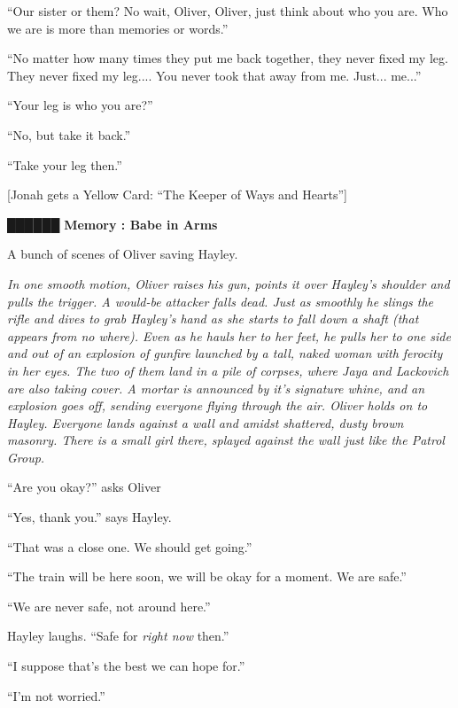 ``Our sister or them?  No wait, Oliver, Oliver, just think about who you are.  Who we are is more than memories or words.''

``No matter how many times they put me back together, they never fixed my leg.  They never fixed my leg.... You never took that away from me.  Just... me...''

``Your leg is who you are?''

``No, but take it back.''

``Take your leg then.'' 



{[}Jonah gets a Yellow Card: ``The Keeper of Ways and Hearts''{]}



 {\LARGE \textbf{ {\color[RGB]{51,51,51}██████} } }  {\LARGE \textbf{ Memory : Babe in Arms} } 



A bunch of scenes of Oliver saving Hayley.



\textit{In one smooth motion, Oliver raises his gun, points it over Hayley's shoulder and pulls the trigger. A would-be attacker falls dead. Just as smoothly he slings the rifle and dives to grab Hayley's hand as she starts to fall down a shaft (that appears from no where). Even as he hauls her to her feet, he pulls her to one side and out of an explosion of gunfire launched by a tall, naked woman with ferocity in her eyes. The two of them land in a pile of corpses, where Jaya and Lackovich are also taking cover. A mortar is announced by it's signature whine, and an explosion goes off, sending everyone flying through the air. Oliver holds on to Hayley. Everyone lands against a wall and amidst shattered, dusty brown masonry. There is a small girl there, splayed against the wall just like the Patrol Group.}



``Are you okay?'' asks Oliver

``Yes, thank you.'' says Hayley.

``That was a close one.  We should get going.''

``The train will be here soon, we will be okay for a moment.  We are safe.''

``We are never safe, not around here.''

Hayley laughs.  ``Safe for \textit{right now} then.''

``I suppose that's the best we can hope for.''

``I'm not worried.''

